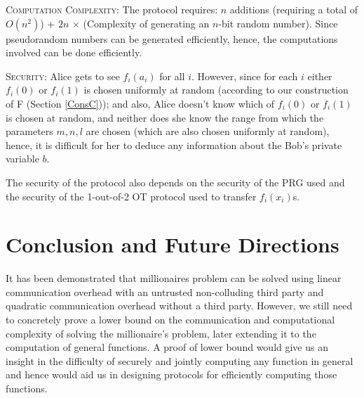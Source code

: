 \documentclass[11pt, letterpaper, romanappendices, onecolumn]{article}
\theoremstyle{plain}\newtheorem{thm}{Theorem}[section]
\theoremstyle{definition}
\theoremstyle{remark}
\begin{document}
\textsc{Computation Complexity:} The protocol requires: $n$ additions (requiring a total of $O(n^2)$) + $2n$ $\times$ (Complexity of generating an $n$-bit random number). Since pseudorandom numbers can be generated efficiently, hence, the computations involved can be done efficiently.

\textsc{Security:}
Alice gets to see $f_i(a_i)$ for all $i$. However, since for each $i$ either $f_i(0)$ or $f_i(1)$ is chosen uniformly at random (according to our construction of F (Section \ref{ConsC})); and also, Alice doesn't know which of $f_i(0)$ or $f_i(1)$ is chosen at random, and neither does she know the range from which the parameters $m,n,l$ are chosen (which are also chosen uniformly at random), hence, it is difficult for her to deduce any information about the Bob's private variable $b$.
\par The security of the protocol also depends on the security of the PRG used and the security of the 1-out-of-2 OT protocol used to transfer $f_i(x_i)$s.

\section{Conclusion and Future Directions}\label{sec4}
\par It has been demonstrated that millionaires problem can be solved using linear communication overhead with an untrusted non-colluding third party and quadratic communication overhead without a third party. However, we still need to concretely prove a lower bound on the communication and computational complexity of solving the millionaire's problem, later extending it to the computation of general functions. A proof of lower bound would give us an insight in the difficulty of securely and jointly computing any function in general and hence would aid us in designing protocols for efficiently computing those functions.
\end{document}
